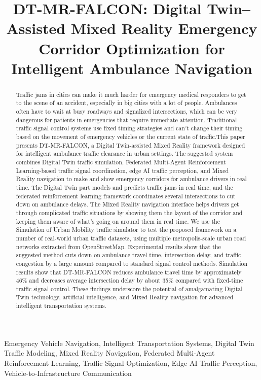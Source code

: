 \documentclass[conference]{IEEEtran}
\title{DT-MR-FALCON: Digital Twin--Assisted Mixed Reality Emergency Corridor Optimization for Intelligent Ambulance Navigation}
\begin{document}
\maketitle

\begin{abstract}
Traffic jams in cities can make it much harder for emergency medical responders to get to the scene of an accident, especially in big cities with a lot of people. Ambulances often have to wait at busy roadways and signalized intersections, which can be very dangerous for patients in emergencies that require immediate attention. Traditional traffic signal control systems use fixed timing strategies and can't change their timing based on the movement of emergency vehicles or the current state of traffic.This paper presents DT-MR-FALCON, a Digital Twin-assisted Mixed Reality framework designed for intelligent ambulance traffic clearance in urban settings. The suggested system combines Digital Twin traffic simulation, Federated Multi-Agent Reinforcement Learning-based traffic signal coordination, edge AI traffic perception, and Mixed Reality navigation to make and show emergency corridors for ambulance drivers in real time. The Digital Twin part models and predicts traffic jams in real time, and the federated reinforcement learning framework coordinates several intersections to cut down on ambulance delays. The Mixed Reality navigation interface helps drivers get through complicated traffic situations by showing them the layout of the corridor and keeping them aware of what's going on around them in real time.
We use the Simulation of Urban Mobility traffic simulator to test the proposed framework on a number of real-world urban traffic datasets, using multiple metropolis-scale urban road networks extracted from OpenStreetMap. Experimental results show that the suggested method cuts down on ambulance travel time, intersection delay, and traffic congestion by a large amount compared to standard signal control methods. Simulation results show that DT-MR-FALCON reduces ambulance travel time by approximately 46\% and decreases average intersection delay by about 35\% compared with fixed-time traffic signal control. These findings underscore the potential of amalgamating Digital Twin technology, artificial intelligence, and Mixed Reality navigation for advanced intelligent transportation systems.
\end{abstract}

\begin{IEEEkeywords}
Emergency Vehicle Navigation, Intelligent Transportation Systems, Digital Twin Traffic Modeling, Mixed Reality Navigation, Federated Multi-Agent Reinforcement Learning, Traffic Signal Optimization, Edge AI Traffic Perception, Vehicle-to-Infrastructure Communication
\end{IEEEkeywords}
\end{document}
